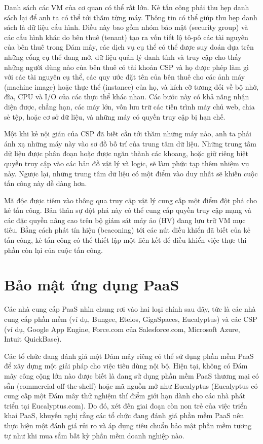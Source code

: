 Danh sách các VM của cơ quan có thể rất lớn. Kẻ tấn công phải thu hẹp danh sách lại để anh ta có thể tới thăm từng máy. Thông tin có thể giúp thu hẹp danh sách là dữ liệu cấu hình. Điều này bao gồm nhóm bảo mật (security group) và các cấu hình khác do bên thuê (tenant) tạo ra vốn tiết lộ tô-pô các tài nguyên của bên thuê trong Đám mây, các dịch vụ cụ thể có thể được suy đoán dựa trên những cổng cụ thể đang mở, dữ liệu quản lý danh tính và truy cập cho thấy những người dùng nào của bên thuê có tài khoản CSP và họ được phép làm gì với các tài nguyên cụ thể, các quy ước đặt tên của bên thuê cho các ảnh máy (machine image) hoặc thực thể (instance) của họ, và kích cỡ tương đối về bộ nhớ, đĩa, CPU và I/O của các thực thể khác nhau. Các bước này có khả năng nhận diện được, chẳng hạn, các máy lớn, vốn lưu trữ các tiến trình máy chủ web, chia sẻ tệp, hoặc cơ sở dữ liệu, và những máy có quyền truy cập bị hạn chế.

Một khi kẻ nội gián của CSP đã biết cần tới thăm những máy nào, anh ta phải ánh xạ những máy này vào sơ đồ bố trí của trung tâm dữ liệu. Những trung tâm dữ liệu được phân đoạn hoặc được ngăn thành các khoang, hoặc giữ riêng biệt quyền truy cập vào các bản đồ vật lý và logic, sẽ làm phức tạp thêm nhiệm vụ này. Ngược lại, những trung tâm dữ liệu có một điểm vào duy nhất sẽ khiến cuộc tấn công này dễ dàng hơn.

Mã độc được tiêm vào thông qua truy cập vật lý cung cấp một điểm đột phá cho kẻ tấn công. Bản thân sự đột phá này có thể cung cấp quyền truy cập mạng và các đặc quyền nâng cao trên bộ giám sát máy ảo (HV) đang lưu trữ VM mục tiêu. Bằng cách phát tín hiệu (beaconing) tới các nút điều khiển đã biết của kẻ tấn công, kẻ tấn công có thể thiết lập một liên kết để điều khiển việc thực thi phần còn lại của cuộc tấn công.

\section{Bảo mật ứng dụng PaaS}

Các nhà cung cấp PaaS nhìn chung rơi vào hai loại chính sau đây, tức là các nhà cung cấp phần mềm (ví dụ, Bungee, Etelos, GigaSpaces, Eucalyptus) và các CSP (ví dụ, Google App Engine, Force.com của Salesforce.com, Microsoft Azure, Intuit QuickBase).

Các tổ chức đang đánh giá một Đám mây riêng có thể sử dụng phần mềm PaaS để xây dựng một giải pháp cho việc tiêu dùng nội bộ. Hiện tại, không có Đám mây công cộng lớn nào được biết là đang sử dụng phần mềm PaaS thương mại có sẵn (commercial off-the-shelf) hoặc mã nguồn mở như Eucalyptus (Eucalyptus có cung cấp một Đám mây thử nghiệm thí điểm giới hạn dành cho các nhà phát triển tại Eucalyptus.com). Do đó, xét đến giai đoạn còn non trẻ của việc triển khai PaaS, khuyến nghị rằng các tổ chức đang đánh giá phần mềm PaaS nên thực hiện một đánh giá rủi ro và áp dụng tiêu chuẩn bảo mật phần mềm tương tự như khi mua sắm bất kỳ phần mềm doanh nghiệp nào.

